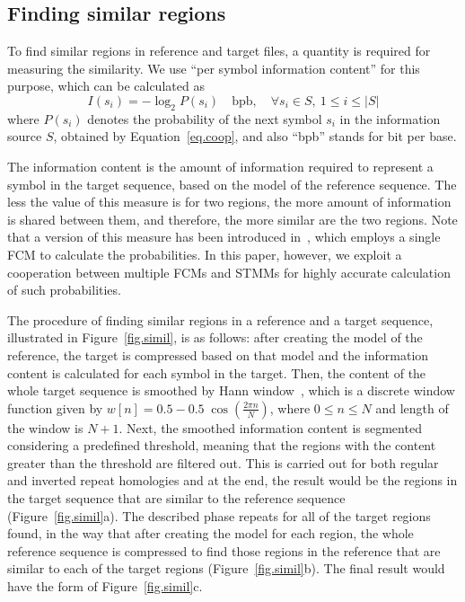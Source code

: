 \documentclass[a4paper,num-refs]{oup-contemporary}
\begin{document}
 \subsection{Finding similar regions}
 To find similar regions in reference and target files, a quantity is required for measuring the similarity. We use ``per symbol information content'' for this purpose, which can be calculated as
 \begin{equation}
   \label{eq.inf.content}
   I(s_i) = -\log_2 P(s_i)\quad \mathrm{bpb}, \quad\forall s_i\in S,~1\le i\le |S|
 \end{equation}
 where $P(s_i)$ denotes the probability of the next symbol $s_i$ in the information source $S$, obtained by Equation~\ref{eq.coop}, and also ``bpb'' stands for bit per base.

 The information content is the amount of information required to represent a symbol in the target sequence, based on the model of the reference sequence. The less the value of this measure is for two regions, the more amount of information is shared between them, and therefore, the more similar are the two regions. Note that a version of this measure has been introduced in~\cite{pratas2015alignment}, which employs a single FCM to calculate the probabilities. In this paper, however, we exploit a cooperation between multiple FCMs and STMMs for highly accurate calculation of such probabilities.

 The procedure of finding similar regions in a reference and a target sequence, illustrated in Figure~\ref{fig.simil}, is as follows: after creating the model of the reference, the target is compressed based on that model and the information content is calculated for each symbol in the target. Then, the content of the whole target sequence is smoothed by Hann window~\cite{blackman1959particular}, which is a discrete window function given by $w[n]=0.5-0.5\;\cos \left({\frac {2\pi n}{N}}\right)$, where $0\le n\le N$ and length of the window is $N+1$. Next, the smoothed information content is segmented considering a predefined threshold, meaning that the regions with the content greater than the threshold are filtered out. This is carried out for both regular and inverted repeat homologies and at the end, the result would be the regions in the target sequence that are similar to the reference sequence (Figure~\ref{fig.simil}a). The described phase repeats for all of the target regions found, in the way that after creating the model for each region, the whole reference sequence is compressed to find those regions in the reference that are similar to each of the target regions (Figure~\ref{fig.simil}b). The final result would have the form of Figure~\ref{fig.simil}c.
\end{document}
